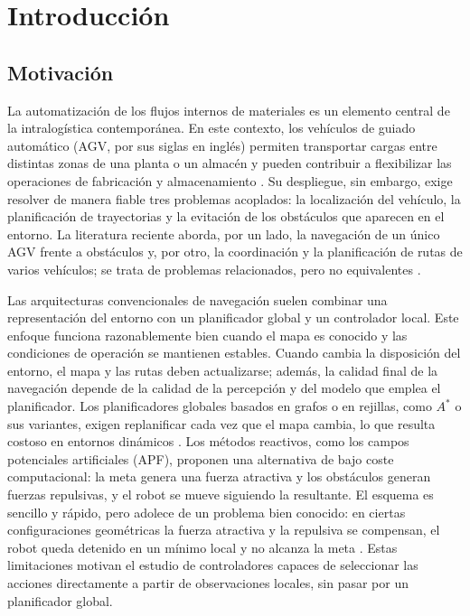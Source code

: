 \chapter{Introducción}\label{chap:introduccion}


\section{Motivación}\label{sec:motivacion}
La automatización de los flujos internos de materiales es un elemento central
de la intralogística contemporánea. En este contexto, los vehículos de guiado
automático (AGV, por sus siglas en inglés) permiten transportar cargas entre
distintas zonas de una planta o un almacén y pueden contribuir a flexibilizar
las operaciones de fabricación y almacenamiento \citep{hu2020deep,ye2023toward}.
Su despliegue, sin embargo, exige resolver de manera fiable tres problemas
acoplados: la localización del vehículo, la planificación de trayectorias y la
evitación de los obstáculos que aparecen en el entorno. La literatura reciente
aborda, por un lado, la navegación de un único AGV frente a obstáculos y, por
otro, la coordinación y la planificación de rutas de varios vehículos; se trata
de problemas relacionados, pero no equivalentes \citep{ye2023toward,hu2020deep}.

Las arquitecturas convencionales de navegación suelen combinar una
representación del entorno con un planificador global y un controlador local.
Este enfoque funciona razonablemente bien cuando el mapa es conocido y las
condiciones de operación se mantienen estables. Cuando cambia la disposición
del entorno, el mapa y las rutas deben actualizarse; además, la calidad final
de la navegación depende de la calidad de la percepción y del modelo que
emplea el planificador. Los planificadores globales basados en grafos o en
rejillas, como $A^*$ o sus variantes, exigen replanificar cada vez que el
mapa cambia, lo que resulta costoso en entornos dinámicos
\citep{sivashangaran2023deep}. Los métodos reactivos, como los campos
potenciales artificiales (APF), proponen una alternativa de bajo coste
computacional: la meta genera una fuerza atractiva y los obstáculos generan
fuerzas repulsivas, y el robot se mueve siguiendo la resultante. El esquema
es sencillo y rápido, pero adolece de un problema bien conocido: en ciertas
configuraciones geométricas la fuerza atractiva y la repulsiva se compensan,
el robot queda detenido en un mínimo local y no alcanza la meta
\citep{perez2022navigation}. Estas limitaciones motivan el estudio de
controladores capaces de seleccionar las acciones directamente a partir de
observaciones locales, sin pasar por un planificador global.

